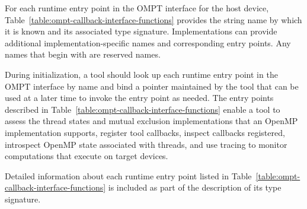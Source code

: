 For each runtime entry point in the OMPT interface for the host device,
Table~\ref{table:ompt-callback-interface-functions} provides the string
name by which it is known and its associated type signature. Implementations
can provide additional implementation-specific names and corresponding
entry points.  Any names that begin with  are reserved names.

During initialization, a tool should look up each runtime entry point in the
OMPT interface by name and bind a pointer maintained by the tool
that can be used at a later time to invoke the entry point as needed. The entry points
described in Table~\ref{table:ompt-callback-interface-functions}
enable a tool to assess
the thread states and mutual exclusion implementations that an OpenMP
implementation supports,
register tool callbacks, inspect callbacks registered,
introspect OpenMP state associated with threads, and use tracing to monitor
computations that execute on target devices.

Detailed information about each runtime entry point listed in
Table~\ref{table:ompt-callback-interface-functions} is included as
part of the description of its type signature.

